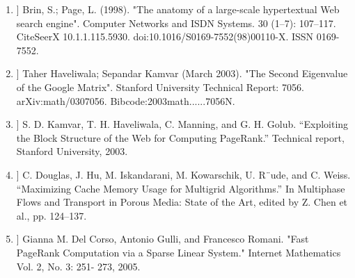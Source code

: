\documentclass[a0,portrait]{a0poster}
\begin{document}
\begin{multicols}{2}
\begin{enumerate}
\item[[2]] Brin, S.; Page, L. (1998). "The anatomy of a large-scale hypertextual Web search engine". 
Computer Networks and ISDN Systems. 30 (1–7): 107–117. CiteSeerX 10.1.1.115.5930. doi:10.1016/S0169-7552(98)00110-X. ISSN 0169-7552. 

\item[[3]] Taher Haveliwala; Sepandar Kamvar (March 2003). "The Second Eigenvalue of the Google Matrix". 
Stanford University Technical Report: 7056. arXiv:math/0307056. Bibcode:2003math......7056N. 

\item[[4]] S. D. Kamvar, T. H. Haveliwala, C. Manning, and G. H. Golub. “Exploiting the Block Structure of the Web for Computing PageRank.” Technical report, Stanford University, 2003.

\item[[5]] C. Douglas, J. Hu, M. Iskandarani, M. Kowarschik, U. R¨ude, and C. Weiss. “Maximizing Cache Memory Usage for Multigrid Algorithms.” In Multiphase Flows and Transport in Porous Media: State of the Art, edited by Z. Chen et al., pp. 124–137. 

\item[[6]] Gianna M. Del Corso, Antonio Gulli, and Francesco Romani. "Fast PageRank Computation via a Sparse Linear System." Internet Mathematics Vol. 2, No. 3: 251- 273, 2005.
\end{enumerate}


\end{multicols}
\end{document}
